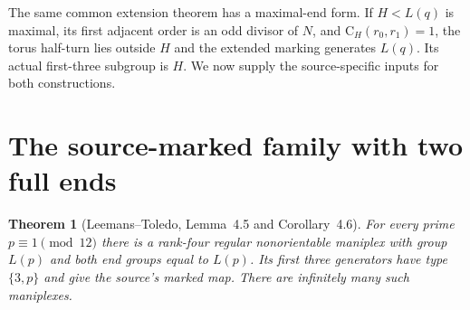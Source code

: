 \documentclass[11pt]{article}
\newtheorem{theorem}{Theorem}
\newcommand{\CG}{\mathrm C}
\begin{document}
The same common extension theorem has a maximal-end form. If
$H<L(q)$ is maximal, its first adjacent order is an odd divisor of $N$,
and $\CG_H(r_0,r_1)=1$, the torus half-turn lies outside $H$ and the
extended marking generates $L(q)$. Its actual first-three subgroup is
$H$. We now supply the source-specific inputs for both constructions.

\section{The source-marked family with two full ends}
\begin{theorem}[Leemans--Toledo, Lemma~4.5 and Corollary~4.6]
\label{thm:full-family}
For every prime $p\equiv1\pmod{12}$ there is a rank-four regular
nonorientable maniplex with group $L(p)$ and both end groups equal to
$L(p)$. Its first three generators have type $\{3,p\}$ and give the
source's marked map. There are infinitely many such maniplexes.
\end{theorem}
\end{document}
